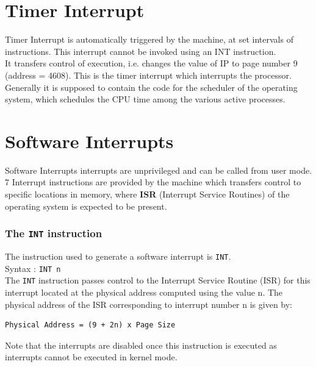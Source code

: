 \documentclass[11pt]{report}
\begin{document}
\section{Timer Interrupt }
Timer Interrupt is automatically triggered by the machine, at set intervals of instructions. This interrupt cannot be invoked using an INT instruction.\\

 It transfers control of execution, i.e. changes the value of IP to page number 9 (address = 4608). This is the timer interrupt which interrupts the processor. Generally it is supposed to contain the code for the scheduler of the operating system, which schedules the CPU time among the various active processes.



\section{Software Interrupts }
Software Interrupts interrupts are unprivileged and can be called from user mode. 7 Interrupt instructions are provided by the machine which transfers control to specific locations in memory, where \textbf{ISR} (Interrupt Service Routines) of the operating system is expected to be present.

\subsubsection{The \texttt{INT} instruction}
The instruction used to generate a software interrupt is \texttt{INT}.\\
Syntax : \texttt{INT n}\\
The \texttt{INT} instruction passes control to the Interrupt Service Routine (ISR) for this interrupt located at the physical address computed using the value n. The physical address of the ISR corresponding to interrupt number n is given by: 
\begin{verbatim}
Physical Address = (9 + 2n) x Page Size
\end{verbatim}
Note that the interrupts are disabled once this instruction is executed as interrupts cannot be executed in kernel mode.\\
\end{document}

